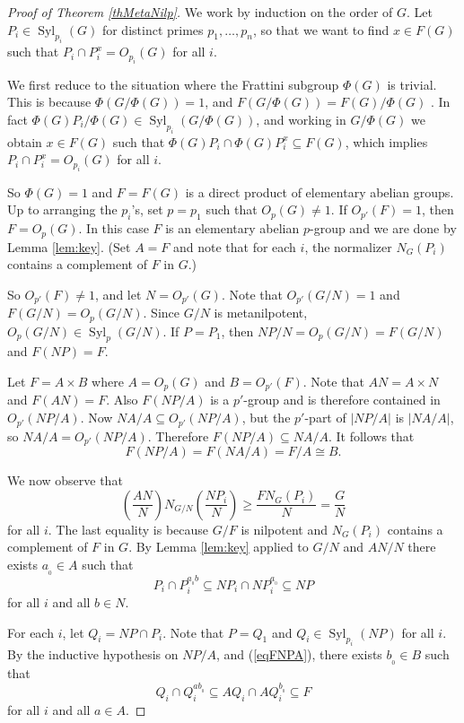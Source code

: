 \documentclass[11pt]{amsart}
\numberwithin{equation}{section}
\theoremstyle{definition}
\theoremstyle{remark}
\newcommand{\Syl}{\mathop{\mathrm{Syl}}}
\begin{document}
\begin{proof}[Proof of Theorem \ref{thMetaNilp}]
We work by induction on the order of $G$.
Let $P_i \in \Syl_{p_i}(G)$ for distinct primes $p_1,\ldots,p_n$,
so that we want to find $x \in F(G)$ such that $P_i \cap P_i^x = O_{p_i}(G)$ for all $i$.

We first reduce to the situation where the Frattini subgroup $\Phi(G)$ is trivial.
This is because $\Phi(G/\Phi(G))=1$,
and $F(G/\Phi(G))=F(G)/\Phi(G)$ \cite[Th. 10.6(c)]{DH92}.
In fact $\Phi(G)P_i/\Phi(G) \in \Syl_{p_i}(G/\Phi(G))$,
and working in $G/\Phi(G)$ we obtain $x \in F(G)$ such that $\Phi(G)P_i \cap  \Phi(G)P_i^x \subseteq F(G)$, which implies $P_i \cap P_i^x = O_{p_i}(G)$ for all $i$.

So $\Phi(G)=1$ and $F=F(G)$ is a direct product of elementary abelian groups.
Up to arranging the $p_i$'s, set $p=p_1$ such that $O_p(G) \neq 1$.
If $O_{p'}(F)=1$, then $F=O_p(G)$.
In this case $F$ is an elementary abelian $p$-group and we are done by Lemma \ref{lem:key}. (Set $A=F$ and note that for each $i$, the normalizer $N_G(P_i)$ contains a complement of $F$ in $G$.)

So $O_{p'}(F) \neq 1$, and let $N=O_{p'}(G)$.
Note that $O_{p'}(G/N)=1$ and $F(G/N) = O_p(G/N)$.
Since $G/N$ is metanilpotent, $O_p(G/N) \in \Syl_p(G/N)$.
If $P=P_1$, then $NP/N=O_p(G/N)=F(G/N)$ and $F(NP)=F$.

Let $F = A \times B$ where $A=O_p(G)$ and $B=O_{p'}(F)$.
Note that $AN=A \times N$ and $F(AN)=F$.
Also $F(NP/A)$ is a $p'$-group and is therefore contained in $O_{p'}(NP/A)$.
Now $NA/A \subseteq O_{p'}(NP/A)$,
but the $p'$-part of $|NP/A|$ is $|NA/A|$, so $NA/A = O_{p'}(NP/A)$.
Therefore $F(NP/A) \subseteq NA/A$.
It follows that 
\begin{equation} \label{eqFNPA}
F(NP/A)=F(NA/A) = F/A \cong B . 
\end{equation}

We now observe that
$$ \left( \frac{AN}{N} \right) N_{G/N}\left(\frac{NP_i}{N}\right)
\geqslant
\frac{F N_G(P_i)}{N}
= \frac{G}{N} $$
for all $i$.
The last equality is because $G/F$ is nilpotent and $N_G(P_i)$ contains a complement of $F$ in $G$.
By Lemma \ref{lem:key} applied to $G/N$ and $AN/N$ there exists $a_{_0} \in A$ such that
\begin{equation} \label{eqInsideNP}
 P_i \cap P_i^{a_{_0} b} \subseteq NP_i \cap NP_i^{a_{_0}} \subseteq NP 
\end{equation} 
for all $i$ and all $b \in N$.

For each $i$, let $Q_i = NP \cap P_i$.
Note that $P=Q_1$ and $Q_i \in \Syl_{p_i}(NP)$ for all $i$.
By the inductive hypothesis on $NP/A$, and (\ref{eqFNPA}), there exists $b_{_0} \in B$ such that 
\begin{equation} \label{eqInsideF}
Q_i \cap Q_i^{a b_{_0}} \subseteq AQ_i \cap A Q_i^{b_{_0}} \subseteq F
\end{equation}
for all $i$ and all $a \in A$.


\end{proof}
\end{document}
